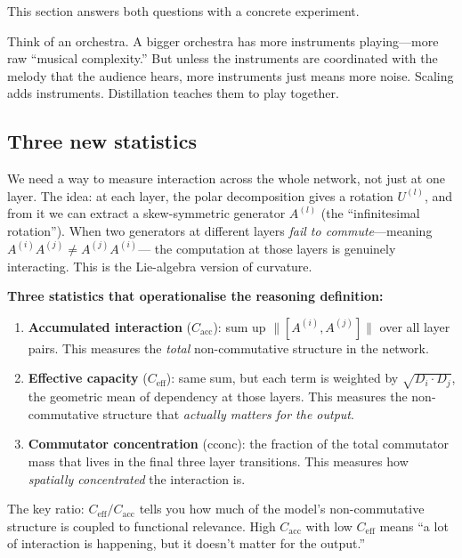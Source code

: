 \documentclass[11pt, twoside, openright]{memoir}
\begin{document}
This section answers both questions with a concrete experiment.

\begin{analogy}
Think of an orchestra. A bigger orchestra has more instruments playing---more
raw ``musical complexity.'' But unless the instruments are coordinated with
the melody that the audience hears, more instruments just means more noise.
Scaling adds instruments. Distillation teaches them to play together.
\end{analogy}

\subsection{Three new statistics}

We need a way to measure interaction across the whole network, not just at
one layer. The idea: at each layer, the polar decomposition gives a rotation
$U^{(l)}$, and from it we can extract a skew-symmetric generator $A^{(l)}$
(the ``infinitesimal rotation''). When two generators at different layers
\emph{fail to commute}---meaning $A^{(i)} A^{(j)} \neq A^{(j)} A^{(i)}$---
the computation at those layers is genuinely interacting. This is the
Lie-algebra version of curvature.

\begin{keyidea}
\textbf{Three statistics that operationalise the reasoning definition:}
\begin{enumerate}[nosep]
\item \textbf{Accumulated interaction} ($C_{\mathrm{acc}}$): sum up
  $\|[A^{(i)}, A^{(j)}]\|$ over all layer pairs. This measures the
  \emph{total} non-commutative structure in the network.
\item \textbf{Effective capacity} ($C_{\mathrm{eff}}$): same sum, but each
  term is weighted by $\sqrt{D_i \cdot D_j}$, the geometric mean of
  dependency at those layers. This measures the non-commutative structure
  that \emph{actually matters for the output}.
\item \textbf{Commutator concentration} ($\mathrm{cconc}$): the fraction of
  the total commutator mass that lives in the final three layer transitions.
  This measures how \emph{spatially concentrated} the interaction is.
\end{enumerate}
The key ratio: $C_{\mathrm{eff}} / C_{\mathrm{acc}}$ tells you how much of
the model's non-commutative structure is coupled to functional relevance.
High $C_{\mathrm{acc}}$ with low $C_{\mathrm{eff}}$ means ``a lot of
interaction is happening, but it doesn't matter for the output.''
\end{keyidea}
\end{document}
